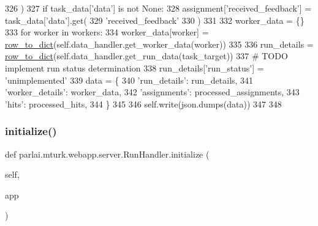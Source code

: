 \begin{DoxyCode}
326                 )
327                 \textcolor{keywordflow}{if} task\_data[\textcolor{stringliteral}{'data'}] \textcolor{keywordflow}{is} \textcolor{keywordflow}{not} \textcolor{keywordtype}{None}:
328                     assignment[\textcolor{stringliteral}{'received\_feedback'}] = task\_data[\textcolor{stringliteral}{'data'}].get(
329                         \textcolor{stringliteral}{'received\_feedback'}
330                     )
331 
332         worker\_data = \{\}
333         \textcolor{keywordflow}{for} worker \textcolor{keywordflow}{in} workers:
334             worker\_data[worker] = \hyperlink{namespaceparlai_1_1mturk_1_1webapp_1_1server_a92be47964fa33a4b6a14d4069d091c7d}{row\_to\_dict}(self.data\_handler.get\_worker\_data(worker))
335 
336         run\_details = \hyperlink{namespaceparlai_1_1mturk_1_1webapp_1_1server_a92be47964fa33a4b6a14d4069d091c7d}{row\_to\_dict}(self.data\_handler.get\_run\_data(task\_target))
337         \textcolor{comment}{# TODO implement run status determination}
338         run\_details[\textcolor{stringliteral}{'run\_status'}] = \textcolor{stringliteral}{'unimplemented'}
339         data = \{
340             \textcolor{stringliteral}{'run\_details'}: run\_details,
341             \textcolor{stringliteral}{'worker\_details'}: worker\_data,
342             \textcolor{stringliteral}{'assignments'}: processed\_assignments,
343             \textcolor{stringliteral}{'hits'}: processed\_hits,
344         \}
345 
346         self.write(json.dumps(data))
347 
348 
\end{DoxyCode}
\mbox{\label{classparlai_1_1mturk_1_1webapp_1_1server_1_1RunHandler_abec3206f51ca4edd33ce201ef4131581}} 
\subsubsection{\texorpdfstring{initialize()}{initialize()}}
{\footnotesize\ttfamily def parlai.\+mturk.\+webapp.\+server.\+Run\+Handler.\+initialize (\begin{DoxyParamCaption}\item[{}]{self,  }\item[{}]{app }\end{DoxyParamCaption})}



